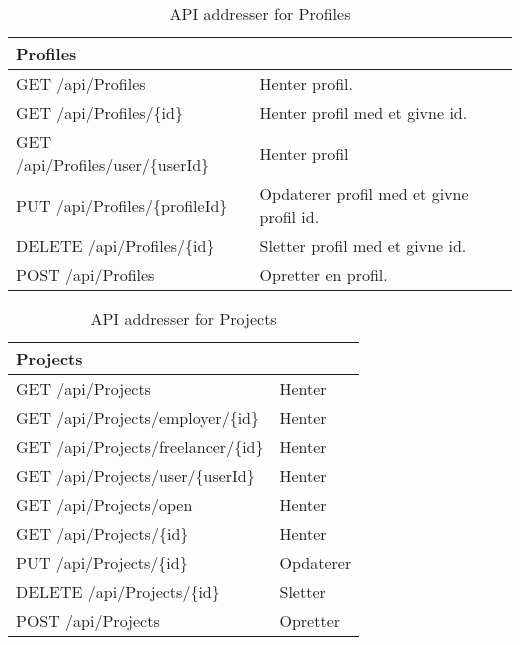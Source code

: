 \begin{table}[H]
	\centering
	\caption{API addresser for Profiles}
	\label{tab:web_user}
	\begin{tabular}{p{5cm}|p{11cm}}
		\hline
		\multicolumn{2}{l}{\textbf{Profiles}}\\
		\hline
		GET \newline
		/api/Profiles &
		Henter profil. \\
        \hline
        GET \newline
		/api/Profiles/\{id\} &
		Henter profil med et givne id. \\
        \hline
        GET \newline
		/api/Profiles/user/\{userId\} &
		Henter profil \\
		\hline
		PUT \newline
		/api/Profiles/\{profileId\} &
		Opdaterer profil med et givne profil id. \\
		\hline
		DELETE \newline
		/api/Profiles/\{id\} &
		Sletter profil med et givne id. \\
		\hline
		POST \newline
		/api/Profiles &
		Opretter en profil. \\
		\hline
		
	\end{tabular}
\end{table}

\begin{table}[H]
	\centering
	\caption{API addresser for Projects}
	\label{tab:web_user}
	\begin{tabular}{p{5cm}|p{11cm}}
		\hline
		\multicolumn{2}{l}{\textbf{Projects}}\\
		\hline
		GET \newline
		/api/Projects &
		Henter  \\
        \hline
        GET \newline
		/api/Projects/employer/\{id\} &
		Henter  \\
        \hline
        GET \newline
		/api/Projects/freelancer/\{id\} &
		Henter  \\
        \hline
        GET \newline
		/api/Projects/user/\{userId\} &
		Henter  \\
        \hline
        GET \newline
		/api/Projects/open &
		Henter  \\
        \hline
        GET \newline
		/api/Projects/\{id\} &
		Henter  \\
		\hline
		PUT \newline
		/api/Projects/\{id\} &
		Opdaterer  \\
		\hline
		DELETE \newline
		/api/Projects/\{id\} &
		Sletter  \\
		\hline
		POST \newline
		/api/Projects &
		Opretter  \\
		\hline
	\end{tabular}
\end{table}

